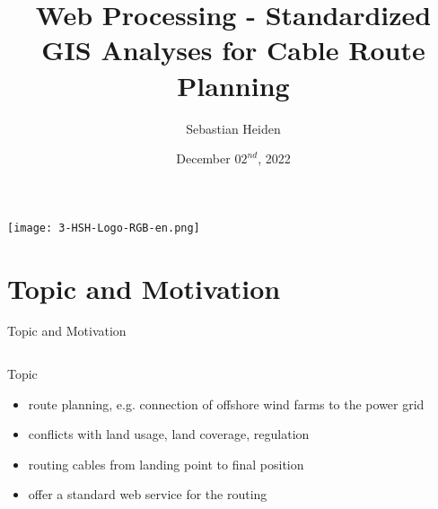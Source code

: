 \documentclass[usenames,dvipsnames,aspectratio=169]{beamer}
\title{Web Processing - Standardized GIS Analyses for Cable Route Planning}
\author{Sebastian Heiden}
\institute{Harz University of Applied Sciences}
\date{December $02^{nd}$, 2022}
\begin{document}
    

\begin{frame}[plain]
	\texttt{[image: 3-HSH-Logo-RGB-en.png]}
    \maketitle
\end{frame}

\section{Topic and Motivation}
\begin{frame}{Topic and Motivation}
\begin{columns}[T] %
\begin{column}{.68\textwidth}
	Topic
	\begin{itemize}
		\item route planning, e.g. connection of offshore wind farms to the power grid
		\item conflicts with land usage, land coverage, regulation
		\item routing cables from landing point to final position
		\item offer a standard web service for the routing


\end{itemize}
\end{column}
\end{columns}
\end{frame}
\end{document}
